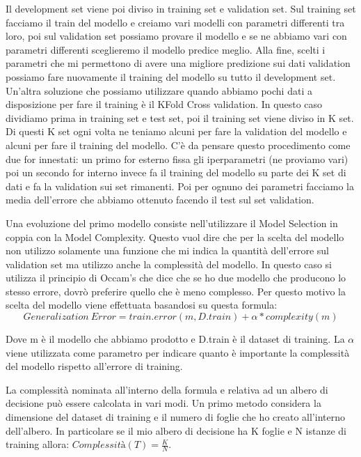 \documentclass[14pt]{extreport}
\begin{document}
Il development set viene poi diviso in training set e validation set. Sul training set facciamo il train del modello e creiamo vari modelli con parametri differenti tra loro, poi sul validation set possiamo provare il modello e se ne abbiamo vari con parametri differenti sceglieremo il modello predice meglio.
Alla fine, scelti i parametri che mi permettono di avere una migliore predizione sui dati validation possiamo fare nuovamente il training del modello su tutto il development set.
Un’altra soluzione che possiamo utilizzare quando abbiamo pochi dati a disposizione per fare il training è il KFold Cross validation. In questo caso dividiamo prima in training set e test set, poi il training set viene diviso in K set. Di questi K set ogni volta ne teniamo alcuni per fare la validation del modello e alcuni per fare il training del modello.
C’è da pensare questo procedimento come due for innestati: un primo for esterno fissa gli iperparametri (ne proviamo vari) poi un secondo for interno invece fa il training del modello su parte dei K set di dati e fa la validation sui set rimanenti. Poi per ognuno dei parametri facciamo la media dell’errore che abbiamo ottenuto facendo il test sul set validation.

Una evoluzione del primo modello consiste nell'utilizzare il Model Selection in coppia con la Model Complexity. Questo vuol dire che per la scelta del modello non utilizzo solamente una funzione che mi indica la quantità dell'errore sul validation set ma utilizzo anche la complessità del modello.
In questo caso si utilizza il principio di Occam's che dice che se ho due modello che producono lo stesso errore, dovrò preferire quello che è meno complesso.
Per questo motivo la scelta del modello viene effettuata basandosi su questa formula:
\begin{equation}
    Generalization\ Error = train.error(m, D.train) + \alpha * complexity(m)
\end{equation}

Dove m è il modello che abbiamo prodotto e D.train è il dataset di training. La $\alpha$ viene utilizzata come parametro per indicare quanto è importante la complessità del modello rispetto all'errore di training.

La complessità nominata all'interno della formula e relativa ad un albero di decisione può essere calcolata in vari modi.
Un primo metodo considera la dimensione del dataset di training e il numero di foglie che ho creato all'interno dell'albero.
In particolare se il mio albero di decisione ha K foglie e N istanze di training allora: $Complessità(T) = \frac{K}{N}$.
\end{document}

